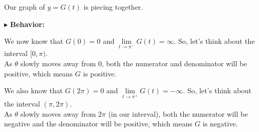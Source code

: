 \documentclass{ximera}
\begin{document}
Our graph of $y=G(t)$ is piecing together.








$\blacktriangleright$ \textbf{\textcolor{blue!55!black}{Behavior: }}  



We now know that $G(0) = 0$ and  $\lim\limits_{t \to \pi^{-}}G(t) = \infty$.  So, let's think about the interval $[0, \pi)$. \\


As $\theta$ slowly moves away from $0$, both the numerator and denominator will be positive, which means $G$ is positive.
 



We also know that $G(2\pi) = 0$ and  $\lim\limits_{t \to \pi^{+}}G(t) = -\infty$.  So, let's think about the interval $(\pi, 2\pi)$. \\


As $\theta$ slowly moves away from $2\pi$ (in our interval), both the numerator will be negative and the denominator will be positive, which means $G$ is negative.
\end{document}
